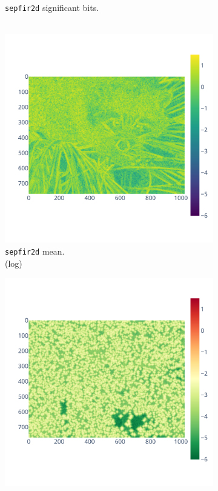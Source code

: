 \documentclass[11pt]{article}
\begin{document}
\begin{figure}
\begin{subfigure}{0.3\linewidth}
    \caption{\centering\texttt{sepfir2d} significant bits. \\ \textcolor{white}{.}}
    \label{fig:bspline_bisplev_sig}
\end{subfigure}
\begin{subfigure}{0.3\linewidth}
    \includegraphics[width=\linewidth]{figure/bspline/bspline_mean_log.pdf}
    \caption{\centering\texttt{sepfir2d} mean. \\(log)}
    \label{fig:bspline_bisplev_mean}
\end{subfigure}
\begin{subfigure}{0.3\linewidth}
    \includegraphics[width=\linewidth]{figure/bspline/bspline_std_log.pdf}

\end{subfigure}
\end{figure}
\end{document}
